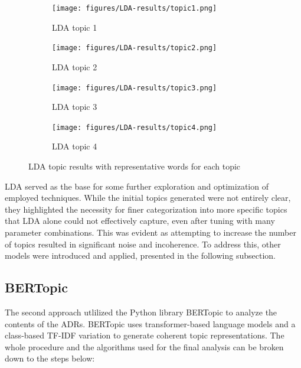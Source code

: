         \begin{figure}[hbt!]
            \begin{subfigure}{.475\linewidth}
              \texttt{[image: figures/LDA-results/topic1.png]}
              \caption{LDA topic 1}
              \label{MLEDdet}
            \end{subfigure}\hfill %
            \begin{subfigure}{.475\linewidth}
              \texttt{[image: figures/LDA-results/topic2.png]}
              \caption{LDA topic 2}
              \label{energydetPSK}
            \end{subfigure}
            \medskip %
            \begin{subfigure}{.475\linewidth}
              \texttt{[image: figures/LDA-results/topic3.png]}
              \caption{LDA topic 3}
              \label{velcomp}
            \end{subfigure}\hfill %
            \begin{subfigure}{.475\linewidth}
              \texttt{[image: figures/LDA-results/topic4.png]}
              \caption{LDA topic 4}
              \label{estcomp}
            \end{subfigure}
            \caption{LDA topic results with representative words for each topic}
            \label{fig:LDA_results}
        \end{figure}

        LDA served as the base for some further exploration and optimization of employed techniques. While the initial topics generated were not entirely clear, they highlighted the necessity for finer categorization into more specific topics that LDA alone could not effectively capture, even after tuning with many parameter combinations. This was evident as attempting to increase the number of topics resulted in significant noise and incoherence. To address this, other models were introduced and applied, presented in the following subsection.

    \subsection{BERTopic}
        The second approach utlilized the Python library BERTopic \cite{bertTopic} to analyze the contents of the ADRs. BERTopic uses transformer-based language models and a class-based TF-IDF variation to generate coherent topic representations. The whole procedure and the algorithms used for the final analysis can be broken down to the steps below:

